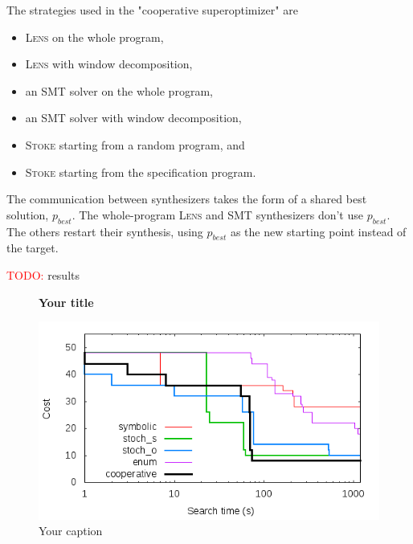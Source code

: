\documentclass[12pt,twoside]{reedthesis}
\newcommand{\red}[1]{\textcolor{red}{#1}}
\begin{document}
        The strategies used in the "cooperative superoptimizer" are
        \begin{itemize}
            \item \textsc{Lens} on the whole program,
            \item \textsc{Lens} with window decomposition,
            \item an SMT solver on the whole program,
            \item an SMT solver with window decomposition,
            \item \textsc{Stoke} starting from a random program, and
            \item \textsc{Stoke} starting from the specification program.
        \end{itemize}
        The communication between synthesizers takes the form of a shared best solution, $p_{best}$.
        The whole-program \textsc{Lens} and SMT synthesizers don't use $p_{best}$. The others restart their synthesis, using $p_{best}$ as the new starting point instead of the target.
        
        \red{TODO:} results
        
        \begin{figure}
            \centering
            \textbf{Your title}\par\medskip
            \includegraphics[scale=0.5]{scaling}
            \caption{Your caption}
        \end{figure}

\end{document}
